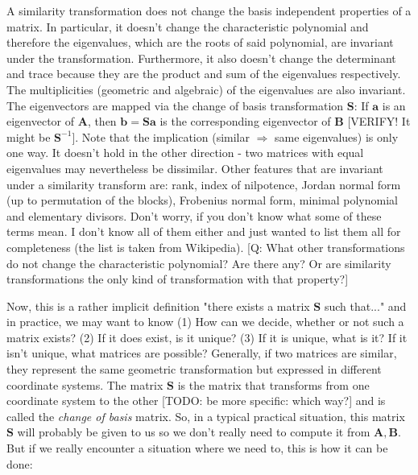\medskip
A similarity transformation does not change the basis independent properties of a matrix. In particular, it doesn't change the characteristic polynomial and therefore the eigenvalues, which are the  roots of said polynomial, are invariant under the transformation. Furthermore, it also doesn't change the determinant and trace because they are the product and sum of the eigenvalues respectively. The multiplicities (geometric and algebraic) of the eigenvalues are also invariant. The eigenvectors are mapped via the change of basis transformation $\mathbf{S}$: If $\mathbf{a}$ is an eigenvector of  $\mathbf{A}$, then $\mathbf{b} = \mathbf{S a}$ is the corresponding eigenvector of $\mathbf{B}$ [VERIFY! It might be $\mathbf{S}^{-1}$]. Note that the implication (similar $\Rightarrow$ same eigenvalues) is only one way. It doesn't hold in the other direction - two matrices with equal eigenvalues may nevertheless be dissimilar. Other features that are invariant under a similarity transform are: rank, index of nilpotence, Jordan normal form (up to permutation of the blocks), Frobenius normal form, minimal polynomial and elementary divisors. Don't worry, if you don't know what some of these terms mean. I don't know all of them either and just wanted to list them all for completeness (the list is taken from Wikipedia). [Q: What other transformations do not change the characteristic polynomial? Are there any? Or are similarity transformations the only kind of transformation with that property?]





\medskip
Now, this is a rather implicit definition "there exists a matrix $\mathbf{S}$ such that..." and in practice, we may want to know (1) How can we decide, whether or not such a matrix exists? (2) If it does exist, is it unique? (3) If it is unique, what is it? If it isn't unique, what matrices are possible? Generally, if two matrices are similar, they represent the same geometric transformation but expressed in different coordinate systems. The matrix $\mathbf{S}$ is the matrix that transforms from one coordinate system to the other [TODO: be more specific: which way?] and is called the \emph{change of basis} matrix. So, in a typical practical situation, this matrix $\mathbf{S}$ will probably be given to us so we don't really need to compute it from $\mathbf{A,B}$. But if we really encounter a situation where we need to, this is how it can be done:

